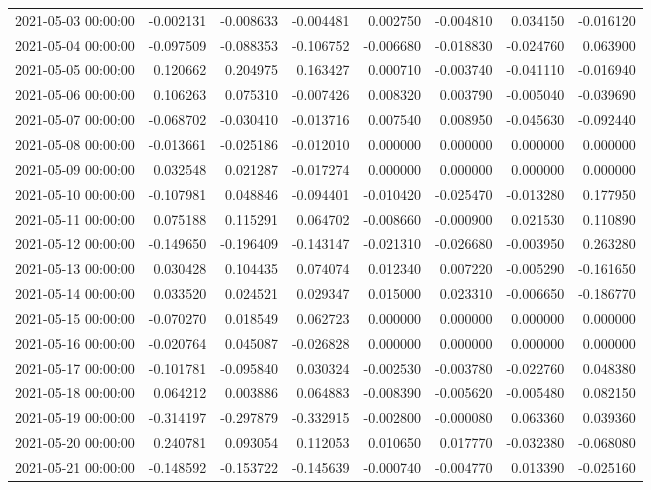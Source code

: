 \begin{tabular}{lrrrrrrr}
2021-05-03 00:00:00 & -0.002131 & -0.008633 & -0.004481 & 0.002750 & -0.004810 & 0.034150 & -0.016120 \\
2021-05-04 00:00:00 & -0.097509 & -0.088353 & -0.106752 & -0.006680 & -0.018830 & -0.024760 & 0.063900 \\
2021-05-05 00:00:00 & 0.120662 & 0.204975 & 0.163427 & 0.000710 & -0.003740 & -0.041110 & -0.016940 \\
2021-05-06 00:00:00 & 0.106263 & 0.075310 & -0.007426 & 0.008320 & 0.003790 & -0.005040 & -0.039690 \\
2021-05-07 00:00:00 & -0.068702 & -0.030410 & -0.013716 & 0.007540 & 0.008950 & -0.045630 & -0.092440 \\
2021-05-08 00:00:00 & -0.013661 & -0.025186 & -0.012010 & 0.000000 & 0.000000 & 0.000000 & 0.000000 \\
2021-05-09 00:00:00 & 0.032548 & 0.021287 & -0.017274 & 0.000000 & 0.000000 & 0.000000 & 0.000000 \\
2021-05-10 00:00:00 & -0.107981 & 0.048846 & -0.094401 & -0.010420 & -0.025470 & -0.013280 & 0.177950 \\
2021-05-11 00:00:00 & 0.075188 & 0.115291 & 0.064702 & -0.008660 & -0.000900 & 0.021530 & 0.110890 \\
2021-05-12 00:00:00 & -0.149650 & -0.196409 & -0.143147 & -0.021310 & -0.026680 & -0.003950 & 0.263280 \\
2021-05-13 00:00:00 & 0.030428 & 0.104435 & 0.074074 & 0.012340 & 0.007220 & -0.005290 & -0.161650 \\
2021-05-14 00:00:00 & 0.033520 & 0.024521 & 0.029347 & 0.015000 & 0.023310 & -0.006650 & -0.186770 \\
2021-05-15 00:00:00 & -0.070270 & 0.018549 & 0.062723 & 0.000000 & 0.000000 & 0.000000 & 0.000000 \\
2021-05-16 00:00:00 & -0.020764 & 0.045087 & -0.026828 & 0.000000 & 0.000000 & 0.000000 & 0.000000 \\
2021-05-17 00:00:00 & -0.101781 & -0.095840 & 0.030324 & -0.002530 & -0.003780 & -0.022760 & 0.048380 \\
2021-05-18 00:00:00 & 0.064212 & 0.003886 & 0.064883 & -0.008390 & -0.005620 & -0.005480 & 0.082150 \\
2021-05-19 00:00:00 & -0.314197 & -0.297879 & -0.332915 & -0.002800 & -0.000080 & 0.063360 & 0.039360 \\
2021-05-20 00:00:00 & 0.240781 & 0.093054 & 0.112053 & 0.010650 & 0.017770 & -0.032380 & -0.068080 \\
2021-05-21 00:00:00 & -0.148592 & -0.153722 & -0.145639 & -0.000740 & -0.004770 & 0.013390 & -0.025160 \\

\end{tabular}
